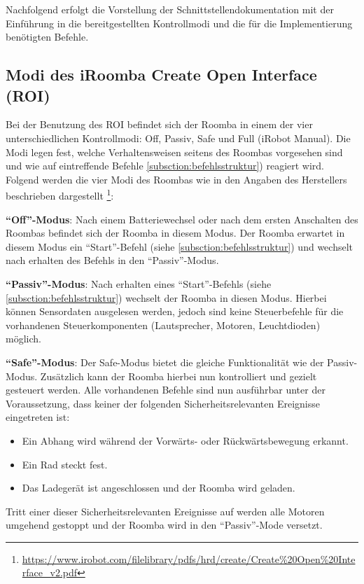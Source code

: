Nachfolgend erfolgt die Vorstellung der Schnittstellendokumentation mit der Einführung in die bereitgestellten Kontrollmodi und die für die Implementierung benötigten Befehle.

\subsection{Modi des iRoomba Create Open Interface (ROI)}
Bei der Benutzung des ROI befindet sich der Roomba in einem der vier unterschiedlichen Kontrollmodi: Off, Passiv, Safe und Full (iRobot Manual). Die Modi legen fest, welche Verhaltensweisen seitens des Roombas vorgesehen sind und wie auf eintreffende Befehle \ref{subsction:befehlsstruktur}) reagiert wird. Folgend werden die vier Modi des Roombas wie in den Angaben des Herstellers beschrieben
dargestellt \footnote{\url{https://www.irobot.com/filelibrary/pdfs/hrd/create/Create\%20Open\%20Interface_v2.pdf}}:

\textbf{\enquote{Off}-Modus}: Nach einem Batteriewechsel oder nach dem ersten Anschalten des Roombas befindet sich der Roomba in diesem Modus. Der Roomba erwartet in diesem Modus ein \enquote{Start}-Befehl (siehe \ref{subsction:befehlsstruktur}) und wechselt nach erhalten des Befehls in den \enquote{Passiv}-Modus.

\textbf{\enquote{Passiv}-Modus}: Nach erhalten eines \enquote{Start}-Befehls (siehe \ref{subsction:befehlsstruktur}) wechselt der Roomba in diesen Modus. Hierbei können Sensordaten ausgelesen werden, jedoch sind keine Steuerbefehle für die vorhandenen Steuerkomponenten (Lautsprecher, Motoren, Leuchtdioden) möglich. 

\textbf{\enquote{Safe}-Modus}: Der Safe-Modus bietet die gleiche Funktionalität wie der Passiv-Modus. Zusätzlich kann der Roomba hierbei nun kontrolliert und gezielt gesteuert werden. Alle vorhandenen Befehle sind nun ausführbar unter der Voraussetzung, dass keiner der folgenden Sicherheitsrelevanten Ereignisse eingetreten ist: 
\begin{itemize}
\item Ein Abhang wird während der Vorwärts- oder Rückwärtsbewegung erkannt.
\item Ein Rad steckt fest.
\item Das Ladegerät ist angeschlossen und der Roomba wird geladen.
\end{itemize}
Tritt einer dieser Sicherheitsrelevanten Ereignisse auf werden alle Motoren umgehend gestoppt und der Roomba wird in den \enquote{Passiv}-Mode versetzt.


